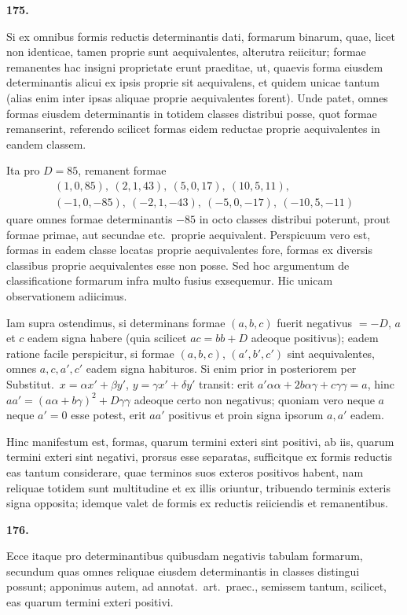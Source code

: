 \documentclass[12pt,a4paper]{article}
\theoremstyle{plain}
\theoremstyle{definition}
\theoremstyle{remark}
\begin{document}
\textbf{175.}

Si ex omnibus formis reductis determinantis dati, formarum binarum, quae, licet non identicae, tamen proprie sunt aequivalentes, alterutra reiicitur; formae remanentes hac insigni proprietate erunt praeditae, ut, quaevis forma eiusdem determinantis alicui ex ipsis proprie sit aequivalens, et quidem unicae tantum (alias enim inter ipsas aliquae proprie aequivalentes forent). Unde patet, omnes formas eiusdem determinantis in totidem classes distribui posse, quot formae remanserint, referendo scilicet formas eidem reductae proprie aequivalentes in eandem classem.

Ita pro $D=85$, remanent formae
\begin{gather*}
(1,0,85),\ (2,1,43),\ (5,0,17),\ (10,5,11),\\
(-1,0,-85),\ (-2,1,-43),\ (-5,0,-17),\ (-10,5,-11)
\end{gather*}
quare omnes formae determinantis $-85$ in octo classes distribui poterunt, prout formae primae, aut secundae etc.\ proprie aequivalent. Perspicuum vero est, formas in eadem classe locatas proprie aequivalentes fore, formas ex diversis classibus proprie aequivalentes esse non posse. Sed hoc argumentum de classificatione formarum infra multo fusius exsequemur. Hic unicam observationem adiicimus.

Iam supra ostendimus, si determinans formae $(a,b,c)$ fuerit negativus $=-D$, $a$ et $c$ eadem signa habere (quia scilicet $ac=bb+D$ adeoque positivus); eadem ratione facile perspicitur, si formae $(a,b,c)$, $(a',b',c')$ sint aequivalentes, omnes $a,c,a',c'$ eadem signa habituros. Si enim prior in posteriorem per Substitut.\ $x=\alpha x'+\beta y'$, $y=\gamma x'+\delta y'$ transit: erit $a'\alpha\alpha+2b\alpha\gamma+c\gamma\gamma=a$, hinc $aa'=(a\alpha+b\gamma)^2+D\gamma\gamma$ adeoque certo non negativus; quoniam vero neque $a$ neque $a'=0$ esse potest, erit $aa'$ positivus et proin signa ipsorum $a,a'$ eadem.

Hinc manifestum est, formas, quarum termini exteri sint positivi, ab iis, quarum termini exteri sint negativi, prorsus esse separatas, sufficitque ex formis reductis eas tantum considerare, quae terminos suos exteros positivos habent, nam reliquae totidem sunt multitudine et ex illis oriuntur, tribuendo terminis exteris signa opposita; idemque valet de formis ex reductis reiiciendis et remanentibus.

\textbf{176.}

Ecce itaque pro determinantibus quibusdam negativis tabulam formarum, secundum quas omnes reliquae eiusdem determinantis in classes distingui possunt; apponimus autem, ad annotat.\ art.\ praec., semissem tantum, scilicet, eas quarum termini exteri positivi.
\end{document}

